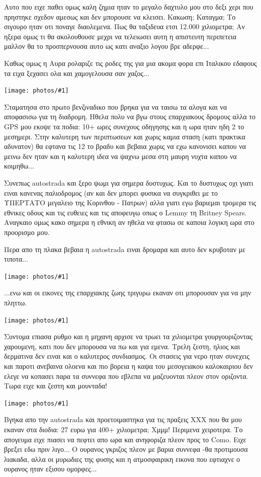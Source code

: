 \documentclass[11pt, letterpaper]{book}
\newcommand\photo[1]{\begin{center}\noindent\texttt{[image: photos/\#1]}\end{center}}
\begin{document}
Αυτο που ειχε παθει ομως καλη ζημια ηταν το μεγαλο δαχτυλο μου στο δεξι χερι που πρηστηκε σχεδον αμεσως και δεν μπορουσε να κλεισει. Κακωση; Καταγμα; Το σιγουρο ηταν οτι ποναγε διαολεμενα. Πως θα ταξιδευα ετσι 12.000 χιλιομετρα; Αν ηξερα ομως τι θα ακολουθουσε μεχρι να τελειωσει αυτη η απιστευτη περιπετεια μαλλον θα το προσπερνουσα αυτο ως κατι αναξιο λογου βρε αδερφε...

Καθως ομως η Αυρα ρολαριζε τις ροδες της για μια ακομα φορα επι Ιταλικου εδαφους τα ειχα ξεχασει ολα και χαμογελουσα σαν χαζος...

\photo{8.jpg}

Σταματησα στο πρωτο βενζιναδικο που βρηκα για να ταισω τα αλογα και να αποφασισω για τη διαδρομη. Ηθελα πολυ να βγω στους επαρχιακους δρομους αλλα το GPS μου εκοψε τα ποδια: 10+ ωρες συνεχους οδηγησης και η ωρα ηταν ηδη 2 το μεσημερι. Στην καλυτερη των περιπτωσεων και χωρις καμια σταση (κατι πρακτικα αδυνατον) θα εφτανα τις 12 το βραδυ και βεβαια χωρις να εχω κανονισει καπου να μεινω δεν ηταν και η καλυτερη ιδεα να ψαχνω μεσα στη μαυρη νυχτα καπου να κοιμηθω...

Συνεπως autostrada και ξερο ψωμι για σημερα δυστυχως.
Και το δυστυχως οχι γιατι ειναι κανενας παλιοδρομος (αν και δεν μπορει φυσικα να συγκριθει με το ΥΠΕΡΤΑΤΟ μεγαλειο της Κορινθου - Πατρων) αλλα γιατι εγω βαριεμαι τρομερα τις εθνικες οδους και τις ευθειες και τις αποφευγω οπως ο Lemmy τη Britney Spears. Αναγκαιο ομως κακο σημερα η εθνικη αν ηθελα να φτασω σε καποια λογικη ωρα στο προορισμο μου.

Περα απο τη πλακα βεβαια η autostrada ειναι δρομαρα και αυτο δεν κρυβοταν με τιποτα...

\photo{9.jpg}

...ενω και οι εικονες της επαρχιακης ζωης τριγυρω εκαναν οτι μπορουσαν για να μην πληττω.

\photo{10.jpg}

Συντομα επιασα ρυθμο και η μηχανη αρχισε να τρωει τα χιλιομετρα γουργουριζοντας χαρουμενη, κατι που δεν μπορουσα να πω και για εμενα. Τρελη ζεστη, ηλιος και δερματινα δεν ειναι και ο καλυτερος συνδιασμος. 
Οι στασεις για νερο ηταν συνεχεις και παροτι ανεβαινα ολοενα και πιο βορεια η καψα του μεσογειακου καλοκαιριου δεν ελεγε να κοπασει παρα τα συννεφα που εβλεπα να μαζευονται πλεον στον οριζοντα. 
Τωρα ειχε και ζεστη και μουνταδα!

\photo{11.jpg}

Βγηκα απο την autostrada και προετοιμαστηκα για τις πραξεις ΧΧΧ που θα μου εκαναν στα διοδια: 27 ευρω για 400+ χιλιομετρα; Χμμμ! Περιμενα χειροτερα.
Το απογευμα ειχε πιασει να πεφτει απο ωρα και ανηφοριζα πλεον προς το Como. Ειχε βρεξει εδω πριν λιγο... Ο ουρανος γκριζος πλεον με βαρια συννεφα -θα προτιμουσα λιακαδα, αλλα οι μυρωδιες της φυσης και η ατμοσφαιρικη εικονα που εφτιαχνε ο ουρανος ηταν εξισου ομορφες...
\end{document}
